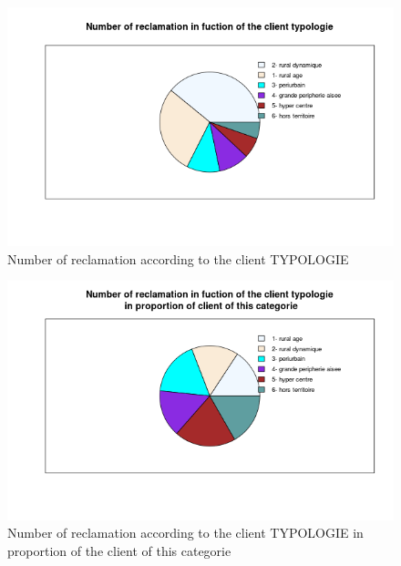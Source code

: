 \documentclass[a4paper, 11pt]{article}
\begin{document}
        \begin{figure}[!ht]
        	\centering
                \includegraphics[height = 10 cm]{Valentin/Number_of_reclamation_in_fuction_of_the_client_typologie.png}
                \caption{Number of reclamation according to the client TYPOLOGIE}
                \label{fig:reclamtion_typo}
        \end{figure}
        
        \begin{figure}[!ht]
        	\centering
                \includegraphics[height = 10 cm]{Valentin/Number_of_reclamation_in_fuction_of_the_client_typologie_in_proportion.png}
                \caption{Number of reclamation according to the client TYPOLOGIE in proportion of the client of this categorie}
                \label{fig:reclamtion_typo2}
        \end{figure}
        
\end{document}
